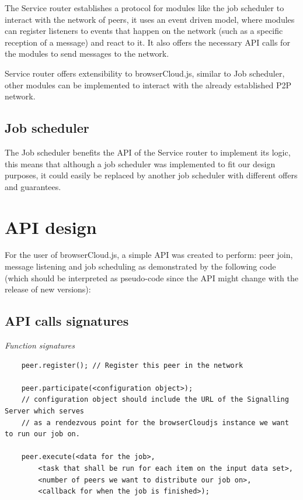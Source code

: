 The Service router establishes a protocol for modules like the job scheduler to interact with the network of peers, it uses an event driven model, where modules can register listeners to events that happen on the network (such as a specific reception of a message) and react to it. It also offers the necessary API calls for the modules to send messages to the network.

Service router offers extensibility to browserCloud.js, similar to Job scheduler, other modules can be implemented to interact with the already established P2P network.

\subsection{Job scheduler}

The Job scheduler benefits the API of the Service router to implement its logic, this means that although a job scheduler was implemented to fit our design purposes, it could easily be replaced by another job scheduler with different offers and guarantees.

\section{API design}

For the user of browserCloud.js, a simple API was created to perform: peer join, message listening and job scheduling as demonstrated by the following code (which should be interpreted as pseudo-code since the API might change with the release of new versions):

\subsection{API calls signatures}

\textit{Function signatures}
\begingroup
\scriptsize
\begin{verbatim}
    peer.register(); // Register this peer in the network

    peer.participate(<configuration object>);
    // configuration object should include the URL of the Signalling Server which serves 
    // as a rendezvous point for the browserCloudjs instance we want to run our job on.

    peer.execute(<data for the job>, 
        <task that shall be run for each item on the input data set>,
        <number of peers we want to distribute our job on>,
        <callback for when the job is finished>);

\end{verbatim}
\endgroup

